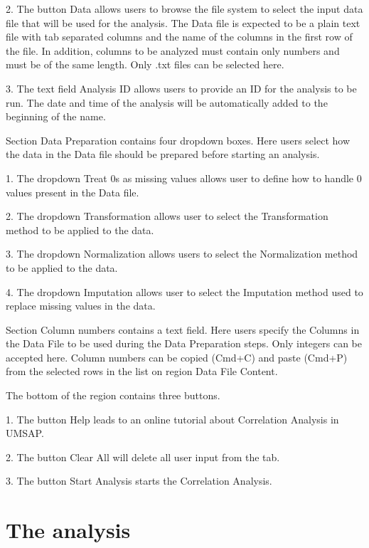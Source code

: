 \num{2}. The button Data allows users to browse the file system to select the input
data file that will be used for the analysis. The Data file is expected to be a
plain text file with tab separated columns and the name of the columns in the first
row of the file. In addition, columns to be analyzed must contain only numbers and
must be of the same length. Only .txt files can be selected here.

\num{3}. The text field Analysis ID allows users to provide an ID for the analysis
to be run. The date and time of the analysis will be automatically added to the
beginning of the name.

Section Data Preparation contains four dropdown boxes. Here users select how the data
in the Data file should be prepared before starting an analysis.

\num{1}. The dropdown Treat \num{0}s as missing values allows user to define how
to handle \num{0} values present in the Data file.

\num{2}. The dropdown Transformation allows user to select the Transformation method
to be applied to the data.

\num{3}. The dropdown Normalization allows users to select the Normalization method
to be applied to the data.

\num{4}. The dropdown Imputation allows user to select the Imputation method used
to replace missing values in the data.

Section Column numbers contains a text field. Here users specify the Columns in the
Data File to be used during the Data Preparation steps. Only integers can be accepted
here. Column numbers can be copied (Cmd+C) and paste (Cmd+P) from the selected rows
in the list on region Data File Content.

The bottom of the region contains three buttons.

\num{1}. The button Help leads to an online tutorial about Correlation Analysis in
UMSAP.

\num{2}. The button Clear All will delete all user input from the tab.

\num{3}. The button Start Analysis starts the Correlation Analysis.

\section{The analysis}